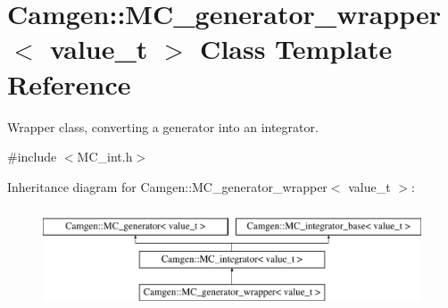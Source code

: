 \hypertarget{a00367}{}\section{Camgen\+:\+:M\+C\+\_\+generator\+\_\+wrapper$<$ value\+\_\+t $>$ Class Template Reference}
\label{a00367}


Wrapper class, converting a generator into an integrator.  




{\ttfamily \#include $<$M\+C\+\_\+int.\+h$>$}

Inheritance diagram for Camgen\+:\+:M\+C\+\_\+generator\+\_\+wrapper$<$ value\+\_\+t $>$\+:\begin{figure}[H]
\begin{center}
\leavevmode
\includegraphics[height=3.000000cm]{a00367}
\end{center}
\end{figure}
